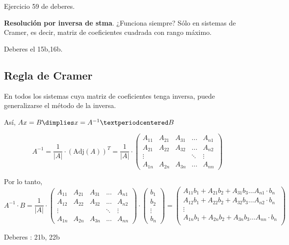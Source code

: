 Ejercicio 59 de deberes.

\textbf{Resolución por inversa de stma}. ¿Funciona siempre? Sólo en sistemas de Cramer, es decir, matriz de coeficientes cuadrada con rango máximo. 

Deberes el 15b,16b.

\subsection{Regla de Cramer}

En todos los sistemas cuya matriz de coeficientes tenga inversa, puede generalizarse el método de la inversa.

Así, $Ax = B \dimplies x = A^{-1}·B$

\[
    A^{-1} = \frac{1}{|A|} · \left( \text{Adj}(A) \right)^T = \frac{1}{|A|} · \begin{pmatrix} 
    A_{11} & A_{21} & A_{31} & ... & A_{n1}\\
    A_{21} & A_{22} & A_{32} & ... & A_{n2}\\
    \vdots &        &       & \ddots & \vdots\\
    A_{1n} & A_{2n} & A_{3n} & ... & A_{nn}\end{pmatrix}
\]

Por lo tanto,
\[
    A^{-1}·B = \frac{1}{|A|} · 
    \begin{pmatrix} 
        A_{11} & A_{21} & A_{31} & ... & A_{n1}\\
        A_{12} & A_{22} & A_{32} & ... & A_{n2}\\
        \vdots &        &       & \ddots & \vdots\\
        A_{1n} & A_{2n} & A_{3n} & ... & A_{nn}\end{pmatrix}·
    \begin{pmatrix}
        b_1\\b_2\\\vdots\\ b_n
    \end{pmatrix}
    = 
    \begin{pmatrix}
    A_{11}b_1 + A_{21}b_2 + A_{31}b_3 \dots A_{n1}·b_n\\
    A_{12}b_1 + A_{22}b_2 + A_{32}b_3 \dots A_{n2}·b_n\\
    \vdots\\
    A_{1n}b_1 + A_{2n}b_2 + A_{3n}b_3 \dots A_{nn}·b_n\\
    \end{pmatrix}
\]

Deberes : 21b, 22b

